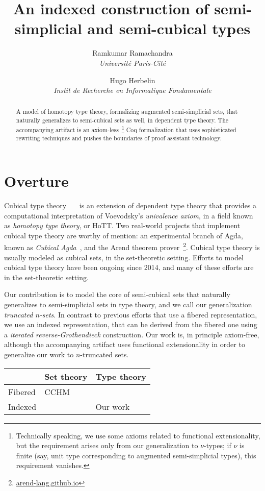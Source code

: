 \documentclass[10pt]{art}
\title{An indexed construction of semi-simplicial and semi-cubical types}
\author{
  \textcolor{gray80}{Ramkumar Ramachandra} \\
  \itshape \textcolor{gray80}{Université Paris-Cité}
  \and
  \textcolor{gray80}{Hugo Herbelin} \\
  \itshape \textcolor{gray80}{Instit de Recherche en Informatique Fondamentale}
}
\date{}
\begin{document}
\thispagestyle{empty}
\maketitle
\begin{abstract}
  A model of homotopy type theory, formalizing augmented semi-simplicial sets, that naturally generalizes to semi-cubical sets as well, in dependent type theory. The accompanying artifact is an axiom-less~\footnote{Technically speaking, we use some axioms related to functional extensionality, but the requirement arises only from our generalization to $\nu$-types; if $\nu$ is finite (say, unit type corresponding to augmented semi-simplicial types), this requirement vanishes.} Coq formalization that uses sophisticated rewriting techniques and pushes the boundaries of proof assistant technology.
\end{abstract}
\tableofcontents
\newpage

\section{Overture}
Cubical type theory~\cite{Bezem14}~\cite{Cohen16}~\cite{Angiuli17} is an extension of dependent type theory that provides a computational interpretation of Voevodsky's \emph{univalence axiom}, in a field known as \emph{homotopy type theory}, or HoTT. Two real-world projects that implement cubical type theory are worthy of mention: an experimental branch of Agda, known as \emph{Cubical Agda}~\cite{Vezzosi21}, and the Arend theorem prover~\footnote{\href{https://arend-lang.github.io}{arend-lang.github.io}}. Cubical type theory is usually modeled as cubical sets, in the set-theoretic setting. Efforts to model cubical type theory have been ongoing since 2014, and many of these efforts are in the set-theoretic setting.

Our contribution is to model the core of semi-cubical sets that naturally generalizes to semi-simplicial sets in type theory, and we call our generalization \emph{truncated $n$-sets}. In contrast to previous efforts that use a fibered representation, we use an indexed representation, that can be derived from the fibered one using a \emph{iterated reverse-Grothendieck} construction. Our work is, in principle axiom-free, although the accompanying artifact uses functional extensionality in order to generalize our work to $n$-truncated sets.

\begin{table}[H]
  \begin{tabularx}{\linewidth}{p{.3\linewidth}|p{.3\linewidth}|p{.3\linewidth}}
    \toprule
            & Set theory & Type theory \\
    \midrule
    Fibered & CCHM       &             \\
    \midrule
    Indexed &            & Our work    \\
    \bottomrule
  \end{tabularx}
\end{table}
\end{document}
